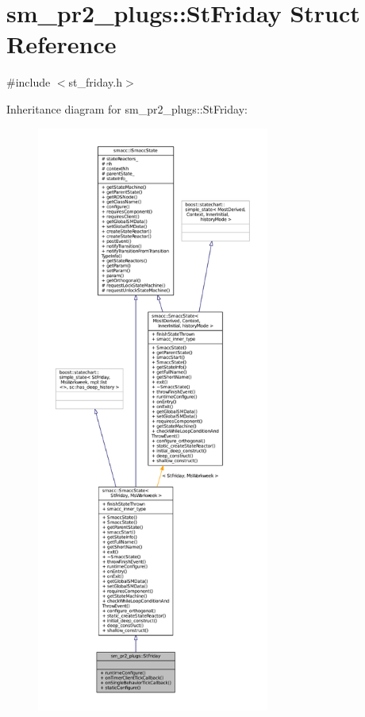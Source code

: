 \hypertarget{structsm__pr2__plugs_1_1StFriday}{}\section{sm\+\_\+pr2\+\_\+plugs\+:\+:St\+Friday Struct Reference}
\label{structsm__pr2__plugs_1_1StFriday}


{\ttfamily \#include $<$st\+\_\+friday.\+h$>$}



Inheritance diagram for sm\+\_\+pr2\+\_\+plugs\+:\+:St\+Friday\+:
\nopagebreak
\begin{figure}[H]
\begin{center}
\leavevmode
\includegraphics[height=550pt]{structsm__pr2__plugs_1_1StFriday__inherit__graph}
\end{center}
\end{figure}


